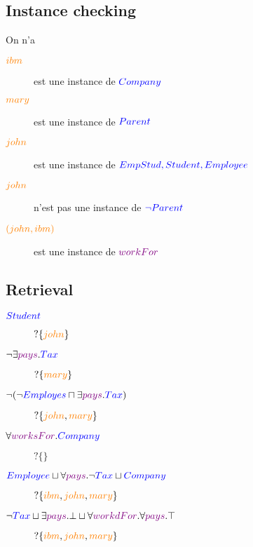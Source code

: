 
\subsection{Instance checking}
On n'a
\begin{description}
\item[$\textcolor{orange}{ibm}$] est une instance de $\textcolor{blue}{Company}$
\item[$\textcolor{orange}{mary}$] est une instance de $\textcolor{blue}{Parent}$
\item[$\textcolor{orange}{john}$] est une instance de $\textcolor{blue}{EmpStud, Student, Employee}$
\item[$\textcolor{orange}{john}$] n'est pas une instance de $\textcolor{blue}{\neg Parent}$
\item[$\textcolor{orange}{(john,ibm)}$] est une instance de $\textcolor{violet}{workFor}$
\end{description}

\subsection{Retrieval}
\begin{description}
\item[$\textcolor{blue}{Student}$] $? \{ \textcolor{orange}{john} \}$
\item[$\neg \exists \textcolor{violet}{pays}.\textcolor{blue}{Tax}$] $? \{ \textcolor{orange}{mary} \}$
\item[$\neg ( \neg \textcolor{blue}{Employes} \sqcap \exists \textcolor{violet}{pays}.\textcolor{blue}{Tax})$] $? \{ \textcolor{orange}{john}, \textcolor{orange}{mary} \}$
\item[$\forall \textcolor{violet}{worksFor}.\textcolor{blue}{Company}$] $? \{ \}$
\item[$\textcolor{blue}{Employee} \sqcup \forall \textcolor{violet}{pays} . \neg \textcolor{blue}{Tax} \sqcup \textcolor{blue}{Company}$] $? \{ \textcolor{orange}{ibm}, \textcolor{orange}{john}, \textcolor{orange}{mary} \}$
\item[$\neg \textcolor{blue}{Tax} \sqcup \exists \textcolor{violet}{pays} . \bot \sqcup \forall \textcolor{violet}{workdFor} . \forall \textcolor{violet}{pays} . \top$] $? \{ \textcolor{orange}{ibm}, \textcolor{orange}{john}, \textcolor{orange}{mary} \}$
\end{description}

